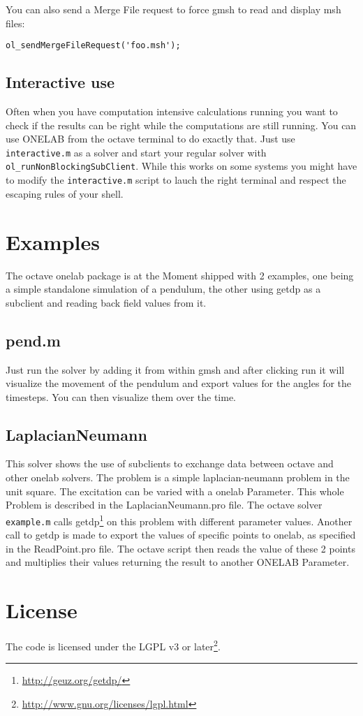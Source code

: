 \documentclass[article,english,colorback,accentcolor=tud9b,11pt]{tudreport}
\begin{document}
		You can also send a Merge File request to force gmsh to read and display msh files:
		\begin{lstlisting}
ol_sendMergeFileRequest('foo.msh');
		\end{lstlisting}

		\subsection{Interactive use}
		Often when you have computation intensive calculations running you want to check if the results can be right while the computations are still running. You can use ONELAB from the octave terminal to do exactly that. Just use \texttt{interactive.m} as a solver and start your regular solver with \texttt{ol\_runNonBlockingSubClient}. While this works on some systems you might have to modify the \texttt{interactive.m} script to lauch the right terminal and respect the escaping rules of your shell.
		\section{Examples}
		The octave onelab package is at the Moment shipped with 2 examples, one being a simple standalone simulation of a pendulum, the other using getdp as a subclient and reading back field values from it.
		\subsection{pend.m}
		Just run the solver by adding it from within gmsh and after clicking run it will visualize the movement of the pendulum and export values for the angles for the timesteps. You can then visualize them over the time.
		\subsection{LaplacianNeumann}
		This solver shows the use of subclients to exchange data between octave and other onelab solvers. The problem is a simple laplacian-neumann problem in the unit square. The excitation can be varied with a onelab Parameter. This whole Problem is described in the LaplacianNeumann.pro file. The octave solver \texttt{example.m} calls getdp\footnote{\url{http://geuz.org/getdp/}} on this problem with different parameter values. Another call to getdp is made to export the values of specific points to onelab, as specified in the ReadPoint.pro file. The octave script then reads the value of these 2 points and multiplies their values returning the result to another ONELAB Parameter. 

		\section{License}
		The code is licensed under the LGPL v3 or later\footnote{\url{http://www.gnu.org/licenses/lgpl.html}}.
\end{document}
